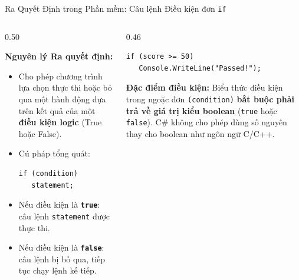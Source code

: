 \documentclass[aspectratio=169, 10pt]{beamer}
\begin{document}
\begin{frame}[fragile]{Ra Quyết Định trong Phần mềm: Câu lệnh Điều kiện đơn \texttt{if}}
  \begin{columns}[T]
    \begin{column}{0.50\textwidth}
      \begin{block}{\textbf{Nguyên lý Ra quyết định:}}
        \begin{itemize}\small
          \item Cho phép chương trình lựa chọn thực thi hoặc bỏ qua một hành động dựa trên kết quả của một \textbf{điều kiện logic} (True hoặc False).
          \item Cú pháp tổng quát:
\begin{lstlisting}
if (condition)
   statement;
\end{lstlisting}
          \item Nếu điều kiện là \textbf{\texttt{true}}: câu lệnh \texttt{statement} được thực thi.
          \item Nếu điều kiện là \textbf{\texttt{false}}: câu lệnh bị bỏ qua, tiếp tục chạy lệnh kế tiếp.
        \end{itemize}
      \end{block}
    \end{column}

    \begin{column}{0.46\textwidth}
      \begin{tcolorbox}[colback=CodeBg,colframe=UniGreen,title=\textbf{Ví dụ kiểm tra điểm đậu môn},fonttitle=\small\bfseries]
\begin{lstlisting}
if (score >= 50)
   Console.WriteLine("Passed!");
\end{lstlisting}
      \end{tcolorbox}

      \begin{exampleblock}{\textbf{Đặc điểm điều kiện:}}
        Biểu thức điều kiện trong ngoặc đơn \texttt{(condition)} \textbf{bắt buộc phải trả về giá trị kiểu boolean} (\texttt{true} hoặc \texttt{false}). C\# không cho phép dùng số nguyên thay cho boolean như ngôn ngữ C/C++.
      \end{exampleblock}
    \end{column}
  \end{columns}
\end{frame}
\end{document}

